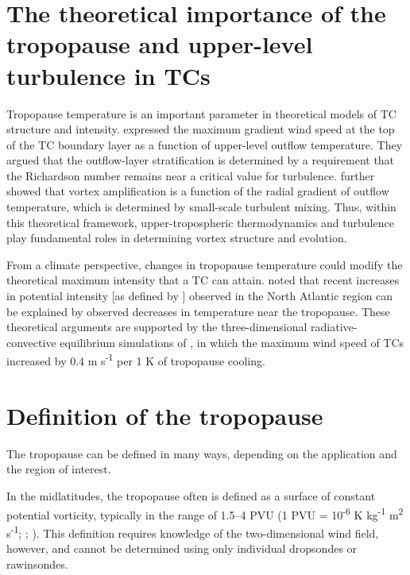 \section{The theoretical importance of the tropopause and upper-level turbulence in TCs}
 
Tropopause temperature is an important parameter in theoretical models of TC structure and intensity.
\cite{EmanuelRotunno2011} expressed the maximum gradient wind speed at the top of the TC boundary layer as a function of upper-level outflow temperature.
They argued that the outflow-layer stratification is determined by a requirement that the Richardson number remains near a critical value for turbulence.
\cite{Emanuel2012} further showed that vortex amplification is a function of the radial gradient of outflow temperature, which is determined by small-scale turbulent mixing.
Thus, within this theoretical framework, upper-tropospheric thermodynamics and turbulence play fundamental roles in determining vortex structure and evolution.

From a climate perspective, changes in tropopause temperature could modify the theoretical maximum intensity that a TC can attain.
\cite{Emanueletal2013} noted that recent increases in potential intensity [as defined by \cite{BisterEmanuel1998}] observed in the North Atlantic region can be explained by observed decreases in temperature near the tropopause.
These theoretical arguments are supported by the three-dimensional radiative-convective equilibrium simulations of \cite{Wangetal2014}, in which the maximum wind speed of TCs increased by 0.4 m s\textsuperscript{-1} per 1 K of tropopause cooling.

\section{Definition of the tropopause}

The tropopause can be defined in many ways, depending on the application and the region of interest.

In the midlatitudes, the tropopause often is defined as a surface of constant potential vorticity, typically in the range of 1.5--4 PVU (1 PVU = 10\textsuperscript{-6} K kg\textsuperscript{-1} m\textsuperscript{2} s\textsuperscript{-1}; \citeauthor{Wilcoxetal2011} \citeyear{Wilcoxetal2011}; \citeauthor{HoltonHakim} \citeyear{HoltonHakim}).
This definition requires knowledge of the two-dimensional wind field, however, and cannot be determined using only individual dropsondes or rawinsondes.

